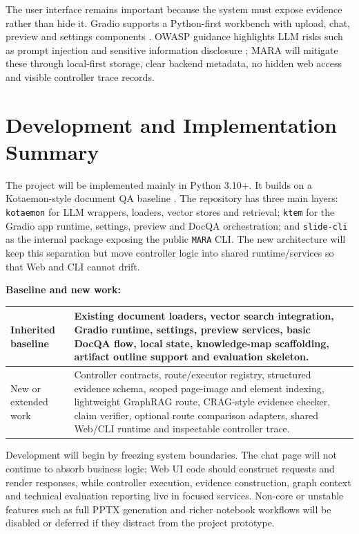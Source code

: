 \documentclass{article}
\begin{document}
The user interface remains important because the system must expose evidence rather than hide it. Gradio supports a Python-first workbench with upload, chat, preview and settings components \cite{gradioDocs}. OWASP guidance highlights LLM risks such as prompt injection and sensitive information disclosure \cite{owaspLLM}; MARA will mitigate these through local-first storage, clear backend metadata, no hidden web access and visible controller trace records.

\section{Development and Implementation Summary}

The project will be implemented mainly in Python 3.10+. It builds on a Kotaemon-style document QA baseline \cite{kotaemon}. The repository has three main layers: \texttt{kotaemon} for LLM wrappers, loaders, vector stores and retrieval; \texttt{ktem} for the Gradio app runtime, settings, preview and DocQA orchestration; and \texttt{slide-cli} as the internal package exposing the public \texttt{MARA} CLI. The new architecture will keep this separation but move controller logic into shared runtime/services so that Web and CLI cannot drift.

\textbf{Baseline and new work:}
\begin{center}
\scriptsize
\begin{tabularx}{\textwidth}{p{}X}
\toprule
Inherited baseline & Existing document loaders, vector search integration, Gradio runtime, settings, preview services, basic DocQA flow, local state, knowledge-map scaffolding, artifact outline support and evaluation skeleton. \\
\midrule
New or extended work & Controller contracts, route/executor registry, structured evidence schema, scoped page-image and element indexing, lightweight GraphRAG route, CRAG-style evidence checker, claim verifier, optional route comparison adapters, shared Web/CLI runtime and inspectable controller trace. \\
\bottomrule
\end{tabularx}
\end{center}

Development will begin by freezing system boundaries. The chat page will not continue to absorb business logic; Web UI code should construct requests and render responses, while controller execution, evidence construction, graph context and technical evaluation reporting live in focused services. Non-core or unstable features such as full PPTX generation and richer notebook workflows will be disabled or deferred if they distract from the project prototype.
\end{document}
